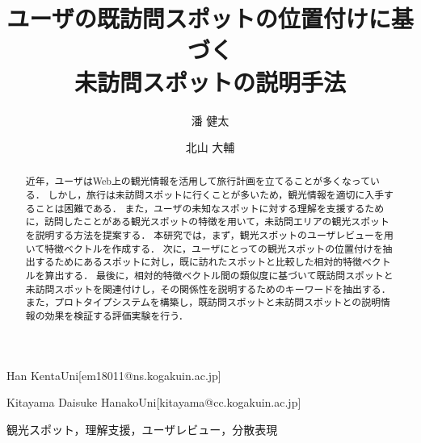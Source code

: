 \documentclass[submit]{ipsj}
\begin{document}
\title{ユーザの既訪問スポットの位置付けに基づく\\未訪問スポットの説明手法}





\author{潘 健太}{Han Kenta}{Uni}[em18011@ns.kogakuin.ac.jp]
\author{北山 大輔}{Kitayama Daisuke Hanako}{Uni}[kitayama@cc.kogakuin.ac.jp]

\begin{abstract}
近年，ユーザはWeb上の観光情報を活用して旅行計画を立てることが多くなっている．
しかし，旅行は未訪問スポットに行くことが多いため，観光情報を適切に入手することは困難である．
また，ユーザの未知なスポットに対する理解を支援するために，訪問したことがある観光スポットの特徴を用いて，未訪問エリアの観光スポットを説明する方法を提案する．
本研究では，まず，観光スポットのユーザレビューを用いて特徴ベクトルを作成する．
次に，ユーザにとっての観光スポットの位置付けを抽出するためにあるスポットに対し，既に訪れたスポットと比較した相対的特徴ベクトルを算出する．
最後に，相対的特徴ベクトル間の類似度に基づいて既訪問スポットと未訪問スポットを関連付けし，その関係性を説明するためのキーワードを抽出する．
また，プロトタイプシステムを構築し，既訪問スポットと未訪問スポットとの説明情報の効果を検証する評価実験を行う．
\end{abstract}


\begin{jkeyword}
観光スポット，理解支援，ユーザレビュー，分散表現
\end{jkeyword}
\end{document}
